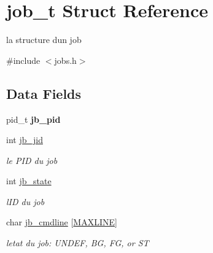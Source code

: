 \hypertarget{structjob__t}{}\section{job\+\_\+t Struct Reference}
\label{structjob__t}


la structure d\textquotesingle{}un job  




{\ttfamily \#include $<$jobs.\+h$>$}

\subsection*{Data Fields}
\begin{DoxyCompactItemize}
\item 
\hypertarget{structjob__t_a82fe3c0cecc3c72f11036d28a9679832}{}pid\+\_\+t {\bfseries jb\+\_\+pid}\label{structjob__t_a82fe3c0cecc3c72f11036d28a9679832}

\item 
\hypertarget{structjob__t_a92658a57dc4aaedcb04db49117b4f724}{}int \hyperlink{structjob__t_a92658a57dc4aaedcb04db49117b4f724}{jb\+\_\+jid}\label{structjob__t_a92658a57dc4aaedcb04db49117b4f724}

\begin{DoxyCompactList}\small\item\em le P\+I\+D du job \end{DoxyCompactList}\item 
\hypertarget{structjob__t_a749b836667db3e8ff7c09fd16a80abbe}{}int \hyperlink{structjob__t_a749b836667db3e8ff7c09fd16a80abbe}{jb\+\_\+state}\label{structjob__t_a749b836667db3e8ff7c09fd16a80abbe}

\begin{DoxyCompactList}\small\item\em l\textquotesingle{}I\+D du job \end{DoxyCompactList}\item 
\hypertarget{structjob__t_af10055dc942d27ceae15c85513aae3f3}{}char \hyperlink{structjob__t_af10055dc942d27ceae15c85513aae3f3}{jb\+\_\+cmdline} \mbox{[}\hyperlink{common_8h_a3e937c42922f7601edb17b747602c471}{M\+A\+X\+L\+I\+N\+E}\mbox{]}\label{structjob__t_af10055dc942d27ceae15c85513aae3f3}

\begin{DoxyCompactList}\small\item\em l\textquotesingle{}etat du job\+: U\+N\+D\+E\+F, B\+G, F\+G, or S\+T \end{DoxyCompactList}\end{DoxyCompactItemize}



